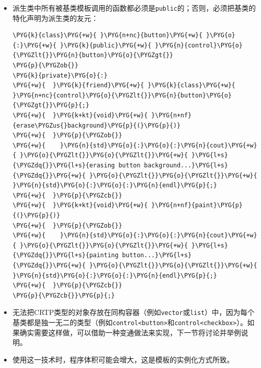 \begin{itemize}
\item 派生类中所有被基类模板调用的函数都必须是\texttt{public}的；否则，必须把基类的特化声明为派生类的友元：



\begin{codeblockbg}
\begin{Verbatim}[commandchars=\\\{\},breaklines=true,breakanywhere=true,fontsize=\codefont,xleftmargin=17bp]
\PYG{k}{class}\PYG{+w}{ }\PYG{n+nc}{button}\PYG{+w}{ }\PYG{o}{:}\PYG{+w}{ }\PYG{k}{public}\PYG{+w}{ }\PYG{n}{control}\PYG{o}{\PYGZlt{}}\PYG{n}{button}\PYG{o}{\PYGZgt{}}
\PYG{p}{\PYGZob{}}
\PYG{k}{private}\PYG{o}{:}
\PYG{+w}{  }\PYG{k}{friend}\PYG{+w}{ }\PYG{k}{class}\PYG{+w}{ }\PYG{n+nc}{control}\PYG{o}{\PYGZlt{}}\PYG{n}{button}\PYG{o}{\PYGZgt{}}\PYG{p}{;}
\PYG{+w}{  }\PYG{k+kt}{void}\PYG{+w}{ }\PYG{n+nf}{erase\PYGZus{}background}\PYG{p}{(}\PYG{p}{)}
\PYG{+w}{  }\PYG{p}{\PYGZob{}}
\PYG{+w}{    }\PYG{n}{std}\PYG{o}{:}\PYG{o}{:}\PYG{n}{cout}\PYG{+w}{ }\PYG{o}{\PYGZlt{}}\PYG{o}{\PYGZlt{}}\PYG{+w}{ }\PYG{l+s}{\PYGZdq{}}\PYG{l+s}{erasing button background...}\PYG{l+s}{\PYGZdq{}}\PYG{+w}{ }\PYG{o}{\PYGZlt{}}\PYG{o}{\PYGZlt{}}\PYG{+w}{ }\PYG{n}{std}\PYG{o}{:}\PYG{o}{:}\PYG{n}{endl}\PYG{p}{;}
\PYG{+w}{  }\PYG{p}{\PYGZcb{}}
\PYG{+w}{  }\PYG{k+kt}{void}\PYG{+w}{ }\PYG{n+nf}{paint}\PYG{p}{(}\PYG{p}{)}
\PYG{+w}{  }\PYG{p}{\PYGZob{}}
\PYG{+w}{    }\PYG{n}{std}\PYG{o}{:}\PYG{o}{:}\PYG{n}{cout}\PYG{+w}{ }\PYG{o}{\PYGZlt{}}\PYG{o}{\PYGZlt{}}\PYG{+w}{ }\PYG{l+s}{\PYGZdq{}}\PYG{l+s}{painting button...}\PYG{l+s}{\PYGZdq{}}\PYG{+w}{ }\PYG{o}{\PYGZlt{}}\PYG{o}{\PYGZlt{}}\PYG{+w}{ }\PYG{n}{std}\PYG{o}{:}\PYG{o}{:}\PYG{n}{endl}\PYG{p}{;}
\PYG{+w}{  }\PYG{p}{\PYGZcb{}}
\PYG{p}{\PYGZcb{}}\PYG{p}{;}
\end{Verbatim}
\end{codeblockbg}



\item 无法把CRTP类型的对象存放在同构容器（例如\texttt{vector}或\texttt{list}）中，因为每个基类都是独一无二的类型（例如\texttt{control<\allowbreak{}button>}和\texttt{control<\allowbreak{}checkbox>}）。如果确实需要这样做，可以借助一种变通做法来实现，下一节将讨论并举例说明。



\item 使用这一技术时，程序体积可能会增大，这是模板的实例化方式所致。

\end{itemize}


